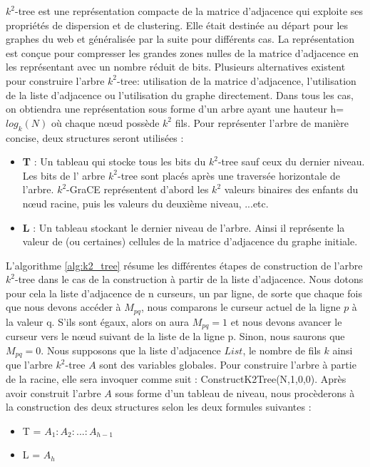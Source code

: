 \documentclass[a4paper,oneside,12pt]{report}
\theoremstyle{definition}
\begin{document}
			$k^2$-tree est une représentation compacte de la matrice d'adjacence qui exploite ses propriétés de dispersion et de clustering. Elle était destinée au départ pour les graphes du web et généralisée par la suite pour différents cas. La représentation est conçue pour compresser les grandes zones nulles de la matrice d'adjacence en les représentant avec un nombre réduit de bits. Plusieurs alternatives existent pour construire l'arbre $k^2$-tree: utilisation de la matrice d'adjacence, l'utilisation de la liste d'adjacence ou l'utilisation du graphe directement. Dans tous les cas, on obtiendra une représentation sous forme d'un arbre ayant une hauteur h= $log_k(N)$ où chaque nœud possède $k^2$ fils. 
			  Pour représenter l'arbre de manière concise, deux structures seront utilisées :
			\begin{itemize}
			\item \textbf{T }: Un tableau qui stocke tous les bits du $k^2$-tree sauf ceux du dernier niveau. Les bits de l' arbre $k^2$-tree sont placés après une traversée horizontale de l'arbre. $k^2$-GraCE représentent d'abord les $k^2$ valeurs binaires des enfants du nœud racine, puis les valeurs du deuxième niveau, ...etc.
			
			\item  \textbf{L} : Un tableau stockant le dernier niveau de l'arbre. Ainsi il représente la valeur de (ou certaines) cellules de la matrice d'adjacence du graphe initiale.
			\end{itemize}
			
			L'algorithme \ref{alg:k2_tree} résume les différentes étapes de construction de l'arbre $k^2$-tree dans le cas de la construction à partir de la liste d'adjacence. Nous dotons pour cela la liste d'adjacence de n curseurs, un par ligne, de sorte que chaque fois que nous devons accéder à $M_{pq}$, nous comparons le curseur actuel de la ligne $p$ à la valeur q. S'ils sont égaux, alors on aura $M_{pq} = 1$ et nous devons avancer le curseur vers le nœud suivant de la liste de la ligne p. Sinon, nous saurons que $M_{pq} = 0$. Nous supposons que la liste d'adjacence $List$, le nombre de fils $k$ ainsi que l'arbre $k^2$-tree $A$ sont des variables globales. Pour construire l'arbre à partie de la racine, elle sera invoquer comme suit :  ConstructK2Tree(N,1,0,0). Après avoir construit l'arbre $A$ sous forme d'un tableau de niveau, nous procèderons à la construction des deux structures selon les deux formules suivantes :
			\begin{itemize}
			 	\item T = $A_1: A_2:. . . :A_{h-1}$
			 	\item L = $A_h$
			\end{itemize}	
\end{document}
